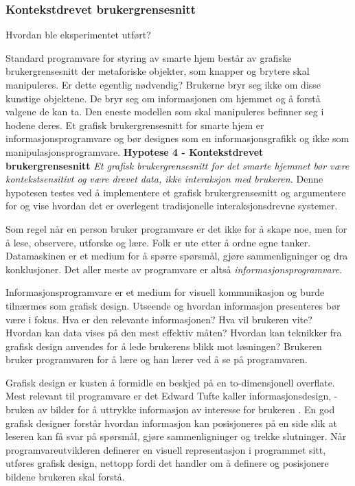 \subsubsection*{Kontekstdrevet brukergrensesnitt}
{\color{red}Hvordan ble eksperimentet utført?}

Standard programvare for styring av smarte hjem består av  grafiske brukergrensesnitt der metaforiske objekter, som knapper og brytere skal manipuleres. Er dette egentlig nødvendig? Brukerne bryr seg ikke om disse kunstige objektene. De bryr seg om informasjonen om hjemmet og å forstå valgene de kan ta. Den eneste modellen som skal manipuleres befinner seg i hodene deres. Et grafisk brukergrensesnitt for smarte hjem er informasjonsprogramvare og bør designes som en informasjonsgrafikk og ikke som manipulasjonsprogramvare.\newline\newline
\textbf{Hypotese 4 - Kontekstdrevet brukergrensesnitt}\newline
\emph{Et grafisk brukergrensesnitt for det smarte hjemmet bør være kontekstsensitivt og være drevet data, ikke interaksjon med brukeren.}\newline
Denne hypotesen testes ved å implementere et grafisk brukergrensesnitt og argumentere for og vise hvordan det er overlegent tradisjonelle interaksjonsdrevne systemer.

Som regel når en person bruker programvare er det ikke for å skape noe, men for å lese, observere, utforske og lære. Folk er ute etter å ordne egne tanker. Datamaskinen er et medium for å spørre spørsmål, gjøre sammenligninger og dra konklusjoner. Det aller meste av programvare er altså \emph{informasjonsprogramvare}. 

Informasjonsprogramvare er et medium for visuell kommunikasjon og burde tilnærmes som grafisk design. Utseende og hvordan informasjon presenteres bør være i fokus. Hva er den relevante informasjonen? Hva vil brukeren vite? Hvordan kan data vises på den mest effektiv måten? Hvordan kan teknikker fra grafisk design anvendes for å lede brukerens blikk mot løsningen? Brukeren bruker programvaren for å lære og han lærer ved å se på programvaren.

Grafisk design er kusten å formidle en beskjed på en to-dimensjonell overflate. Mest relevant til programvare er det Edward Tufte kaller informasjonsdesign, -bruken av bilder for å uttrykke informasjon av interesse for brukeren \citet{tufte01}. En god grafisk designer forstår hvordan informasjon kan posisjoneres på en side slik at leseren kan få svar på spørsmål, gjøre sammenligninger og trekke slutninger. Når programvareutvikleren definerer en visuell representasjon i programmet sitt, utføres grafisk design, nettopp fordi det handler om å definere og posisjonere bildene brukeren skal forstå.

